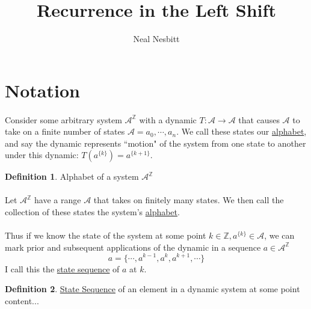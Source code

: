 \documentclass{article}
\title{Recurrence in the Left Shift}
\author{Neal Nesbitt}
\begin{document}
\maketitle

\theoremstyle{definition}
\newtheorem{definition}{Definition}[section]

		
		
\section{Notation}

\paragraph{}
Consider some arbitrary system $\mathcal{A}^{\mathbb{Z}}$ with a dynamic $T:\mathcal{A}\to\mathcal{A}$ that causes $\mathcal{A}$ to take on a finite number of states $\mathcal{A}={a_{0},\cdots,a_{n}}$. We call these states our \underline{alphabet}, and say the dynamic represents ``motion" of the system from one state to another under this dynamic: $T(a^{\{k\}})=a^{\{k+1\}}$.

\begin{definition}{Alphabet of a system $\mathcal{A}^{\mathbb{Z}}$\\\\}
Let $\mathcal{A}^{\mathbb{Z}}$ have a range $\mathcal{A}$ that takes on finitely many states. We then call the collection of these states the system's \underline{alphabet}.
\end{definition}

\paragraph{}
Thus if we know the state of the system at some point $k\in\mathbb{Z},a^{\{k\}}\in\mathcal{A}$, we can mark prior and subsequent applications of the dynamic in a sequence $a \in \mathcal{A}^{\mathbb{Z}}$
\[ a = \{ \cdots,a^{k-1},a^{k},a^{k+1},\cdots \} \]
I call this the \underline{state sequence} of $a$ at $k$.

\begin{definition}{\underline{State Sequence} of an element in a dynamic system at some point\\}
content...
\end{definition}
\end{document}
